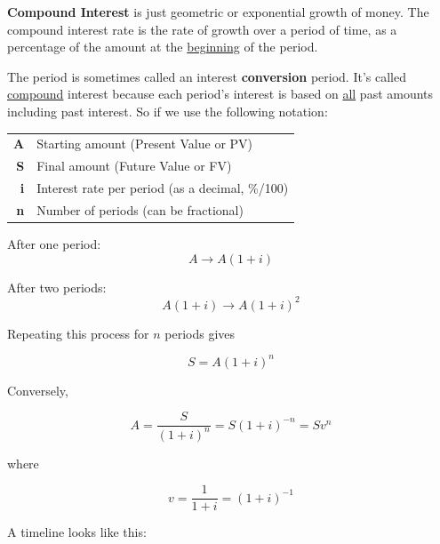 \documentclass[14pt]{extarticle}
\begin{document}

\textbf{Compound Interest} is just geometric or exponential growth
of money.  The compound interest rate is the rate of growth over a period
of time, as a percentage of the amount at the \underline{beginning} of the period.

The period is sometimes called an interest \textbf{conversion} period. It's called \underline{compound}
interest because each period's interest is based on \underline{all} past amounts including past interest.  So
if we use the following notation:
\begin{center}
  \renewcommand{\arraystretch}{1.2}
  \begin{tabular}{rl}
    \textbf{A} & Starting amount (Present Value or PV)           \\
    \textbf{S} & Final amount (Future Value or FV)               \\
    \textbf{i} & Interest rate per period (as a decimal, \%/100) \\
    \textbf{n} & Number of periods (can be fractional)
  \end{tabular}
\end{center}

After one period:
\[
  A \rightarrow A(1+i)
\]

After two periods:
\[
  A(1+i) \rightarrow A(1+i)^2
\]

Repeating this process for $n$ periods gives

\[
  S = A(1+i)^n
\]

Conversely,

\[
  A = \frac{S}{(1+i)^n}
  = S(1+i)^{-n}
  = Sv^n
\]

where

\[
  v = \frac{1}{1+i} = (1+i)^{-1}
\]


\newpage
A timeline looks like this:
\end{document}
